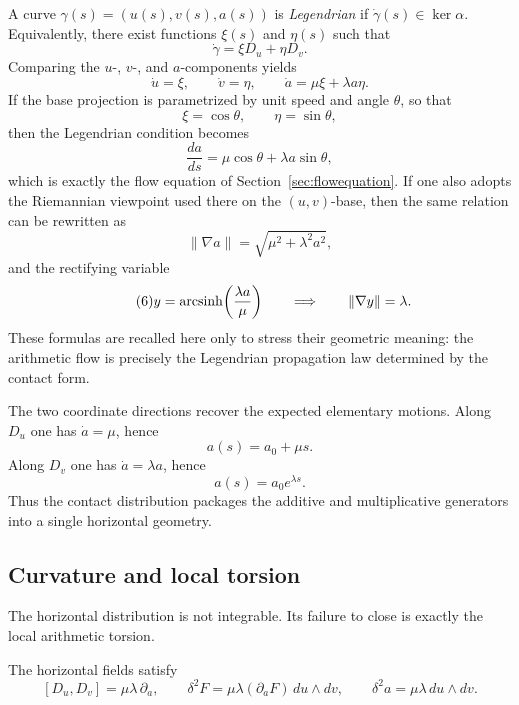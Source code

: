 A curve $\gamma(s)=(u(s),v(s),a(s))$ is \emph{Legendrian} if $\dot\gamma(s)\in\ker\alpha$. Equivalently, there exist functions $\xi(s)$ and $\eta(s)$ such that
\[
    \dot\gamma = \xi D_u + \eta D_v.
\]
Comparing the $u$-, $v$-, and $a$-components yields
\[
    \dot u = \xi,
    \qquad
    \dot v = \eta,
    \qquad
    \dot a = \mu\xi+\lambda a\eta.
\]
If the base projection is parametrized by unit speed and angle $\theta$, so that
\[
    \xi=\cos\theta,
    \qquad
    \eta=\sin\theta,
\]
then the Legendrian condition becomes
\begin{equation}\label{eq:4}\tag{4}
\frac{da}{ds}=\mu\cos\theta+\lambda a\sin\theta,
\end{equation}
which is exactly the flow equation of Section~\ref{sec:flowequation}. If one also adopts the Riemannian viewpoint used there on the $(u,v)$-base, then the same relation can be rewritten as
\begin{equation}\label{eq:5}\tag{5}
\|\nabla a\|=\sqrt{\mu^2+\lambda^2a^2},
\end{equation}
and the rectifying variable
\begin{equation}\label{eq:6}\tag{6}
y=\operatorname{arcsinh}\!\left(\frac{\lambda a}{\mu}\right)
\qquad\Longrightarrow\qquad
\|\nabla y\|=\lambda.
\end{equation}
These formulas are recalled here only to stress their geometric meaning: the arithmetic flow is precisely the Legendrian propagation law determined by the contact form.

The two coordinate directions recover the expected elementary motions. Along $D_u$ one has $\dot a=\mu$, hence
\[
    a(s)=a_0+\mu s.
\]
Along $D_v$ one has $\dot a=\lambda a$, hence
\[
    a(s)=a_0e^{\lambda s}.
\]
Thus the contact distribution packages the additive and multiplicative generators into a single horizontal geometry.

\subsection{Curvature and local torsion}
\label{subsec:local-curvature-and-torsion}

The horizontal distribution is not integrable. Its failure to close is exactly the local arithmetic torsion.

\begin{proposition}\label{prop:local-curvature}
The horizontal fields satisfy
\begin{equation}\label{eq:7}\tag{7}
[D_u,D_v]=\mu\lambda\,\partial_a,
\qquad
\delta^2F=\mu\lambda(\partial_aF)\,du\wedge dv,
\qquad
\delta^2a=\mu\lambda\,du\wedge dv.
\end{equation}
\end{proposition}

